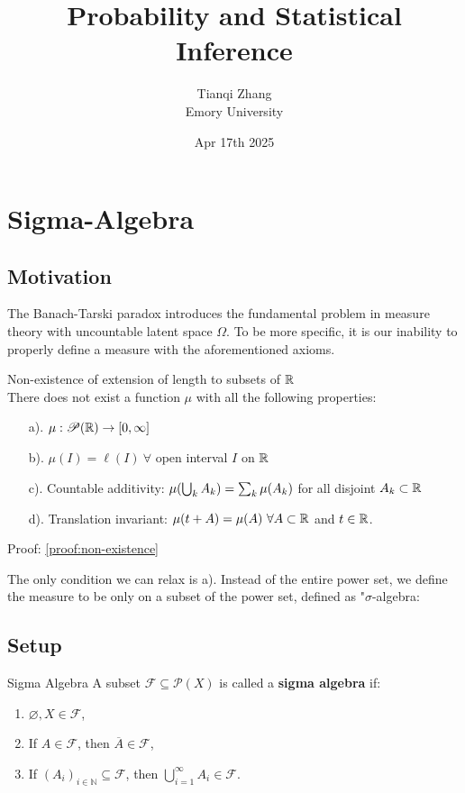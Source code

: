 

\title{\textbf{%
               Probability and Statistical Inference}}
\author{Tianqi Zhang\\
Emory University}
\date{Apr 17th 2025}


\maketitle
\setcounter{tocdepth}{1} %

\setcounter{section}{4}
\section{Sigma-Algebra}
\subsection{Motivation}
The Banach-Tarski paradox introduces the fundamental problem in measure theory with uncountable latent space $\Omega$. To be more specific, it is our inability to properly define a measure with the aforementioned axioms. \\

\begin{prop}{Non-existence of extension of length to  subsets of ${\mathbb{R}}$}\\
	There does not exist a function $\mu$ with all the following properties:
	\begin{enumerate}
		\item [a).] $\mu: \mathscr{P}({\mathbb{R}})\rightarrow [0, \infty]$
		\item [b).]$\mu(I) = \ell(I) \ \forall$ open interval $I$ on ${\mathbb{R}}$
		\item [c).] Countable additivity: $\mu\qty(\bigcup_k A_k) = \sum_k \mu(A_k)$ for all disjoint $A_k\subset {\mathbb{R}}$
		\item [d).]Translation invariant: $\mu(t+A) = \mu(A) \ \forall A\subset {\mathbb{R}}$ and $t\in {\mathbb{R}}$. 
	\end{enumerate}
Proof: \ref{proof:non-existence}
\end{prop}

\noindent The only condition we can relax is a). Instead of the entire power set, we define the measure to be only on a subset of the power set, defined as "$\sigma$-algebra: 

\subsection{Setup}
\begin{thm}{Sigma Algebra}
A subset \(\mathscr{F} \subseteq \mathscr{P}(X)\) is called a \textbf{sigma algebra} if:
\begin{enumerate}
    \item \(\varnothing, X \in \mathscr{F}\),
    \item If \(A \in \mathscr{F}\), then \(\overline A \in \mathscr{F}\),
    \item If \((A_i)_{i \in \mathbb{N}} \subseteq \mathscr{F}\), then \(\bigcup_{i=1}^\infty A_i \in \mathscr{F}\).
\end{enumerate}
\end{thm}

